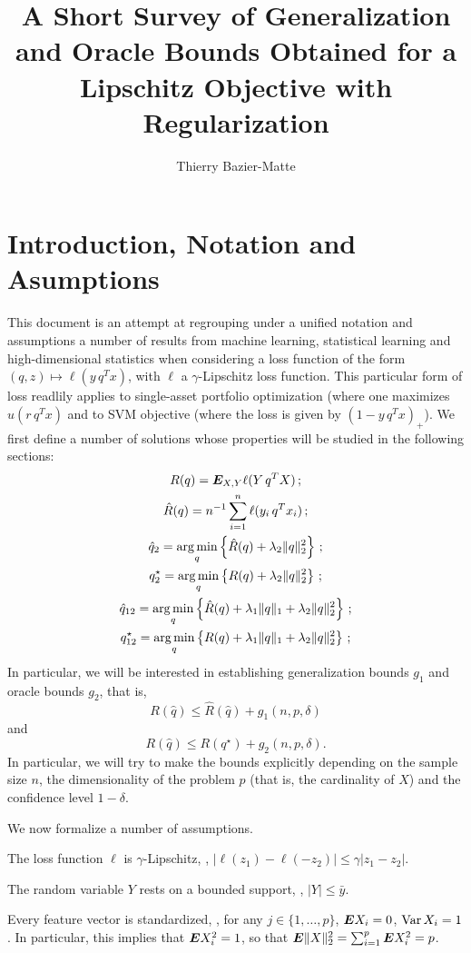 \documentclass{article}
\title{A Short Survey of Generalization and Oracle Bounds Obtained for a Lipschitz
  Objective with Regularization}
\author{Thierry Bazier-Matte}
\begin{document}
\maketitle

\section{Introduction, Notation and Asumptions} 

This document is an attempt at regrouping under a unified notation and assumptions a
number of results from machine learning, statistical learning and high-dimensional
statistics when considering a loss function of the form $(q,z) \mapsto \ell(y\,q^Tx)$,
with $\ell$ a $\gamma$-Lipschitz loss function. This particular form of loss readlily
applies to single-asset portfolio optimization (where one maximizes $u(r\,q^Tx)$ and to
SVM objective (where the loss is given by $(1-y\,q^Tx)_{+}$). We first define a number of
solutions whose properties will be studied in the following sections:
\begin{gather}
  R(q) = \bm E_{X,Y}\ell(Y\,q^TX)\,;\\
  \hat R(q) = n^{-1}\sum_{i=1}^n \ell(y_i\,q^Tx_i)\,;\\
  \hat q_{2} = \operatorname*{arg\,min}_q\left\{\hat R(q) + \lambda_2\|q\|_2^2\right\}\,;\\
  q_{2}^\star = \operatorname*{arg\,min}_q\left\{R(q) + \lambda_2\|q\|_2^2\right\}\,;\\
  \hat q_{12} = \operatorname*{arg\,min}_q\left\{\hat R(q) + \lambda_1\|q\|_1 +
    \lambda_2\|q\|_2^2\right\}\,;\\
  q_{12}^\star = \operatorname*{arg\,min}_q\left\{R(q) + \lambda_1\|q\|_1 + \lambda_2\|q\|_2^2\right\}\,;
\end{gather}
In particular, we will be interested in establishing generalization bounds $g_1$ and
oracle bounds $g_2$, that is,
\[
  R(\hat q) \leq \hat R(\hat q) + g_1(n,p,\delta)
\]
and
\[
  R(\hat q) \leq R(q^\star) + g_2(n,p,\delta).
\]
In particular, we will try to make the bounds explicitly depending on the sample size $n$,
the dimensionality of the problem $p$ (that is, the cardinality of $X$) and the confidence
level $1-\delta$.

We now formalize a number of assumptions.
\begin{assumption}
  The loss function $\ell$ is $\gamma$-Lipschitz, \ie, $|\ell(z_1)-\ell(-z_2)| \leq
  \gamma|z_1-z_2|$. 
\end{assumption}
\begin{assumption}
  The random variable $Y$ rests on a bounded support, \ie, $|Y|\leq\bar y$.
\end{assumption}
\begin{assumption}
  Every feature vector is standardized, \ie, for any $j\in\{1,\dots,p\}$, $\bm E X_i = 0$,
  $\operatorname{Var} X_i = 1$. In particular, this implies that $\bm E X_i^2 = 1$, so that
  $\bm E \|X\|^2_2 = \sum_{i=1}^p \bm E X_i^2 = p$.
\end{assumption}
\end{document}
